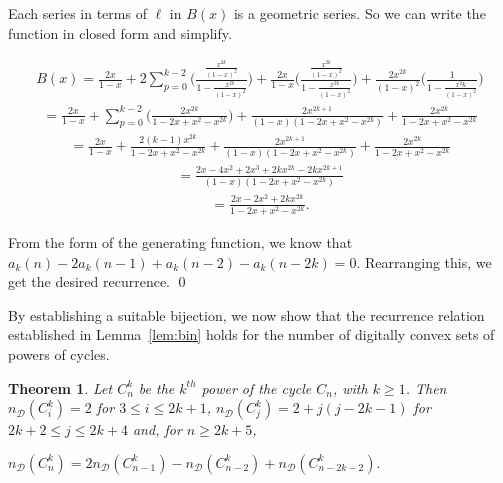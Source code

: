 \documentclass[12pt]{article}
\newtheorem{thm}{Theorem}[section]
\begin{document}
Each series in terms of $\ell$ in $B(x)$ is a geometric series. So we can write the function in closed form and simplify.

\begin{equation*}\begin{gathered}B(x) = \frac{2x}{1-x} + 2\sum_{p=0}^{k-2} \bigg(\frac{\frac{x^{2k}}{(1-x)^2}}{1-\frac{x^{2k}}{(1-x)^2}}\bigg) + \frac{2x}{1-x}\bigg(\frac{\frac{x^{2k}}{(1-x)^2}}{1-\frac{x^{2k}}{(1-x)^2}}\bigg) + \frac{2x^{2k}}{(1-x)^2} \bigg(\frac{1}{1-\frac{x^2k}{(1-x)^2}}\bigg)\end{gathered}\end{equation*}
\begin{equation*}\begin{gathered} = \frac{2x}{1-x} + \sum_{p=0}^{k-2}\bigg(\frac{2x^{2k}}{1-2x+x^2-x^{2k}}\bigg) + \frac{2x^{2k+1}}{(1-x)(1-2x+x^2-x^{2k})} + \frac{2x^{2k}}{1-2x+x^2-x^{2k}}\end{gathered}\end{equation*}
\begin{equation*}\begin{gathered} = \frac{2x}{1-x} + \frac{2(k-1)x^{2k}}{1-2x+x^2-x^{2k}} + \frac{2x^{2k+1}}{(1-x)(1-2x+x^2-x^{2k})} + \frac{2x^{2k}}{1-2x+x^2-x^{2k}}\end{gathered}\end{equation*}
\begin{equation*}\begin{gathered} = \frac{2x-4x^2+2x^3+2kx^{2k}-2kx^{2k+1}}{(1-x)(1-2x+x^2-x^{2k})}\end{gathered}\end{equation*}
\begin{equation*}\begin{gathered} = \frac{2x-2x^2+2kx^{2k}}{1-2x+x^2-x^{2k}}.
\end{gathered}\end{equation*}

From the form of the generating function, we know that $a_k(n)-2a_k(n-1)+a_k(n-2)-a_k(n-2k)=0.$ Rearranging this, we get the desired recurrence. 
\qed 

By establishing a suitable bijection, we now show that the recurrence relation established in Lemma~\ref{lem:bin} holds for the number of digitally convex sets of powers of cycles. 

\begin{thm}
Let $C^k_n$ be the $k^{th}$ power of the cycle $C_n$, with $k\geq 1$. Then $n_\mathscr{D}(C^k_i) = 2$ for $3\leq i \leq 2k+1$, $n_\mathscr{D}(C^k_j) = 2+j(j-2k-1)$ for $2k+2 \leq j \leq 2k+4$ and, for $n\geq 2k+5$, 
\begin{center}$n_\mathscr{D}(C^k_n) = 2n_\mathscr{D}(C^k_{n-1})-n_\mathscr{D}(C^k_{n-2}) + n_\mathscr{D}(C^k_{n-2k-2}).$\end{center}
\label{thm:cyclepower}
\end{thm}
\end{document}
